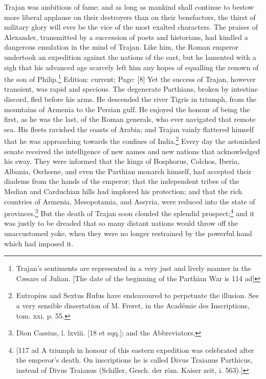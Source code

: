 Trajan was ambitious of fame; and as long as mankind shall continue to bestow more liberal applause on their destroyers than on their benefactors, the thirst of military glory will ever be the vice of the most exalted characters. The praises of Alexander, transmitted by a succession of poets and historians, had kindled a dangerous emulation in the mind of Trajan. Like him, the Roman emperor undertook an expedition against the nations of the east, but he lamented with a sigh that his advanced age scarcely left him any hopes of equalling the renown of the son of Philip.\footnote{Trajan\texthebrew{}’s sentiments are represented in a very just and lively manner in the Cæsars of Julian. [The date of the beginning of the Parthian War is 114 ad]} Edition: current; Page: [8] Yet the success of Trajan, however transient, was rapid and specious. The degenerate Parthians, broken by intestine discord, fled before his arms. He descended the river Tigris in triumph, from the mountains of Armenia to the Persian gulf. He enjoyed the honour of being the first, as he was the last, of the Roman generals, who ever navigated that remote sea. His fleets ravished the coasts of Arabia; and Trajan vainly flattered himself that he was approaching towards the confines of India.\footnote{Eutropius and Sextus Rufus have endeavoured to perpetuate the illusion. See a very sensible dissertation of M. Freret, in the Académie des Inscriptions, tom. xxi. p. 55.} Every day the astonished senate received the intelligence of new names and new nations that acknowledged his sway. They were informed that the kings of Bosphorus, Colchos, Iberia, Albania, Osrhœne, and even the Parthian monarch himself, had accepted their diadems from the hands of the emperor; that the independent tribes of the Median and Carduchian hills had implored his protection; and that the rich countries of Armenia, Mesopotamia, and Assyria, were reduced into the state of provinces.\footnote{Dion Cassius, l. lxviii. [18 et sqq.]; and the Abbreviators.} But the death of Trajan soon clouded the splendid prospect;\footnote{[117 ad A triumph in honour of this eastern expedition was celebrated after the emperor\texthebrew{}’s death. On inscriptions he is called Divus Traianus Parthicus, instead of Divus Traianus (Schiller, Gesch. der röm. Kaiser zeit, i. 563).]} and it was justly to be dreaded that so many distant nations would throw off the unaccustomed yoke, when they were no longer restrained by the powerful hand which had imposed it.

